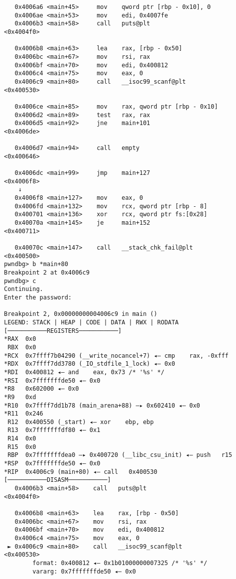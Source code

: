 \begin{lstlisting}
   0x4006a6 <main+45>     mov    qword ptr [rbp - 0x10], 0
   0x4006ae <main+53>     mov    edi, 0x4007fe
   0x4006b3 <main+58>     call   puts@plt                      <0x4004f0>
 
   0x4006b8 <main+63>     lea    rax, [rbp - 0x50]
   0x4006bc <main+67>     mov    rsi, rax
   0x4006bf <main+70>     mov    edi, 0x400812
   0x4006c4 <main+75>     mov    eax, 0
   0x4006c9 <main+80>     call   __isoc99_scanf@plt            <0x400530>
 
   0x4006ce <main+85>     mov    rax, qword ptr [rbp - 0x10]
   0x4006d2 <main+89>     test   rax, rax
   0x4006d5 <main+92>     jne    main+101                      <0x4006de>
 
   0x4006d7 <main+94>     call   empty                         <0x400646>
 
   0x4006dc <main+99>     jmp    main+127                      <0x4006f8>
    ↓
   0x4006f8 <main+127>    mov    eax, 0
   0x4006fd <main+132>    mov    rcx, qword ptr [rbp - 8]
   0x400701 <main+136>    xor    rcx, qword ptr fs:[0x28]
   0x40070a <main+145>    je     main+152                      <0x400711>
 
   0x40070c <main+147>    call   __stack_chk_fail@plt          <0x400500>
pwndbg> b *main+80
Breakpoint 2 at 0x4006c9
pwndbg> c
Continuing.
Enter the password:

Breakpoint 2, 0x00000000004006c9 in main ()
LEGEND: STACK | HEAP | CODE | DATA | RWX | RODATA
[───────────REGISTERS───────────]
*RAX  0x0
 RBX  0x0
*RCX  0x7ffff7b04290 (__write_nocancel+7) ◂— cmp    rax, -0xfff
*RDX  0x7ffff7dd3780 (_IO_stdfile_1_lock) ◂— 0x0
*RDI  0x400812 ◂— and    eax, 0x73 /* '%s' */
*RSI  0x7fffffffde50 ◂— 0x0
*R8   0x602000 ◂— 0x0
*R9   0xd
*R10  0x7ffff7dd1b78 (main_arena+88) —▸ 0x602410 ◂— 0x0
*R11  0x246
 R12  0x400550 (_start) ◂— xor    ebp, ebp
 R13  0x7fffffffdf80 ◂— 0x1
 R14  0x0
 R15  0x0
 RBP  0x7fffffffdea0 —▸ 0x400720 (__libc_csu_init) ◂— push   r15
*RSP  0x7fffffffde50 ◂— 0x0
*RIP  0x4006c9 (main+80) ◂— call   0x400530
[───────────DISASM───────────]
   0x4006b3 <main+58>    call   puts@plt                      <0x4004f0>
 
   0x4006b8 <main+63>    lea    rax, [rbp - 0x50]
   0x4006bc <main+67>    mov    rsi, rax
   0x4006bf <main+70>    mov    edi, 0x400812
   0x4006c4 <main+75>    mov    eax, 0
 ► 0x4006c9 <main+80>    call   __isoc99_scanf@plt            <0x400530>
        format: 0x400812 ◂— 0x1b01000000007325 /* '%s' */
        vararg: 0x7fffffffde50 ◂— 0x0
 

\end{lstlisting}
